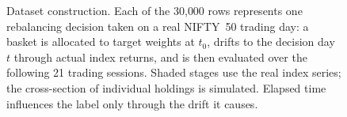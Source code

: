 \begin{figure}[t]
\caption{Dataset construction. Each of the 30{,}000 rows represents one
rebalancing decision taken on a real NIFTY~50 trading day: a basket is allocated
to target weights at $t_0$, drifts to the decision day $t$ through actual index
returns, and is then evaluated over the following 21 trading sessions. Shaded
stages use the real index series; the cross-section of individual holdings is
simulated. Elapsed time influences the label only through the drift it causes.}
\label{fig:f2}
\end{figure}
